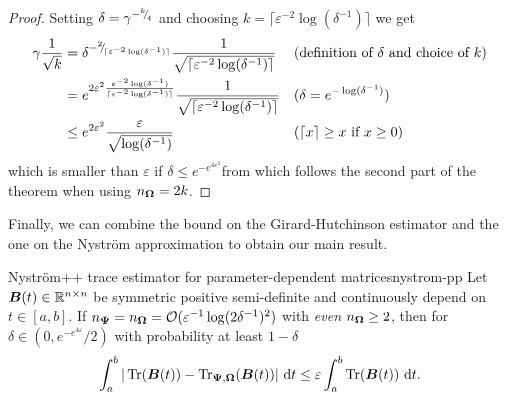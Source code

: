 \documentclass[12pt]{article}
\begin{document}
\begin{proof}
    Setting $\delta = \gamma^{-{}^{k}{\mskip -5mu/\mskip -3mu}_{4}}$ and choosing $k = \lceil \varepsilon^{-2}\log(\delta^{-1}) \rceil$ we get
    \begin{align}
        \gamma \frac{1}{\sqrt{k}}
        &= \delta^{-{}^{2}{\mskip -5mu/\mskip -3mu}_{\lceil \varepsilon^{-2} \log(\delta^{-1}) \rceil}} \frac{1}{\sqrt{\lceil \varepsilon^{-2} \log(\delta^{-1}) \rceil}} && \text{(definition of $\delta$ and choice of $k$)} \notag \\
        &= e^{2\varepsilon^{2} \frac{\varepsilon^{-2}\log(\delta^{-1})}{\lceil \varepsilon^{-2} \log(\delta^{-1}) \rceil}} \frac{1}{\sqrt{\lceil \varepsilon^{-2} \log(\delta^{-1}) \rceil}} && \text{($\delta = e^{-\log(\delta^{-1})}$)} \notag \\ 
        &\leq e^{2\varepsilon^{2}} \frac{\varepsilon}{\sqrt{ \log(\delta^{-1})}} && \text{($\lceil x \rceil \geq x$ if $x \geq 0$)}
    \end{align}
    which is smaller than $\varepsilon$ if $\delta \leq e^{-e^{4 \varepsilon^2}}$from which follows the second part of the theorem when using $n_{\boldsymbol{\Omega}} = 2k$.
\end{proof}

Finally, we can combine the bound on the Girard-Hutchinson estimator  and the one on the Nyström approximation  to obtain our main result.

\begin{theorem}{Nyström++ trace estimator for parameter-dependent matrices}{nystrom-pp}
    Let $\boldsymbol{B}(t) \in \mathbb{R}^{n \times n}$ be symmetric positive semi-definite and continuously depend on $t \in [a, b]$. If $n_{\boldsymbol{\Psi}} = n_{\boldsymbol{\Omega}} = \mathcal{O}(\varepsilon^{-1} \log(2\delta^{-1})^2)$ with \emph{even} $n_{\boldsymbol{\Omega}} \geq 2$, then for $\delta \in (0, e^{-e^{4\varepsilon}} / 2)$ with probability at least $1 - \delta$
    \begin{equation}
        \int_{a}^{b} | \operatorname{Tr}(\boldsymbol{B}(t)) - \operatorname{Tr}_{\boldsymbol{\Psi}, \boldsymbol{\Omega}}(\boldsymbol{B}(t)) |~\mathrm{d}t
        \leq \varepsilon \int_{a}^{b} \operatorname{Tr}(\boldsymbol{B}(t))~\mathrm{d}t.
    \end{equation}
\end{theorem}
\end{document}
